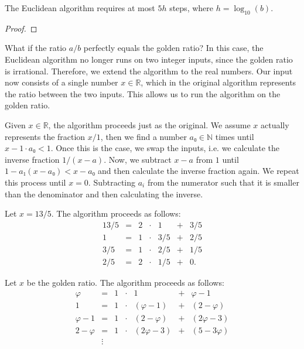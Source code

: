 \begin{proposition}
  The Euclidean algorithm requires at most $5h$ steps,
  where $h = \log_{10}(b)$.
\end{proposition}

\begin{proof}
\end{proof}

What if the ratio $a/b$ perfectly equals the golden ratio?
In this case, the Euclidean algorithm no longer runs on two integer inputs,
since the golden ratio is irrational.
Therefore, we extend the algorithm to the real numbers.
Our input now consists of a single number $x ∈ ℝ$, which in the original
algorithm represents the ratio between the two inputs.
This allows us to run the algorithm on the golden ratio.

Given $x ∈ ℝ$, the algorithm proceeds just as the original.
We assume $x$ actually represents the fraction $x/1$,
then we find a number $a₀ ∈ ℕ$ times until $x - 1 · a₀ < 1$.
Once this is the case, we swap the inputs, i.e. we calculate the inverse fraction $1/(x - a)$.
Now, we subtract $x - a$ from $1$ until $1 - a₁ (x - a₀) < x - a₀$
and then calculate the inverse fraction again.
We repeat this process until $x = 0$.
Subtracting $a_i$ from the numerator such that it is smaller than the
denominator and then calculating the inverse.

\begin{example}
  Let $x = 13/5$.
  The algorithm proceeds as follows:
  \[
    \begin{array}{rclcrcl}
      13/5 & = & 2 & · & 1   & + & 3/5 \\
         1 & = & 1 & · & 3/5 & + & 2/5 \\
       3/5 & = & 1 & · & 2/5 & + & 1/5 \\
       2/5 & = & 2 & · & 1/5 & + & 0.
    \end{array}
  \]
\end{example}

\begin{example}
  Let $x$ be the golden ratio.
  The algorithm proceeds as follows:
  \[
    \begin{array}{rclcrcl}
      φ & = & 1 & · & 1   & + & φ - 1 \\
         1 & = & 1 & · & (φ - 1) & + & (2 - φ) \\
       φ - 1 & = & 1 & · & (2 - φ) & + & (2φ - 3) \\
       2 - φ & = & 1 & · & (2φ - 3) & + & (5 - 3φ) \\
       & \vdots &
    \end{array}
  \]
\end{example}


